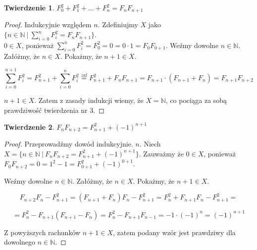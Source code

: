 \documentclass{article}
\newtheorem{thm}{Twierdzenie}
\begin{document}
\begin{thm}
$F_0^2 + F_1^2 + \ldots + F_n^2 = F_nF_{n+1}$
\end{thm}
\begin{proof}
Indukcyjnie względem $n$. Zdefiniujmy $X$ jako $\lbrace n \in \mathbb{N} \ | \ \sum_{i=0}^n F_i^2 = F_nF_{n+1} \rbrace$.\\
$0 \in X$, ponieważ $\sum_{i=0}^n F_i^2 = F_0^2 = 0 = 0 \cdot 1 = F_0 F_{0+1}$.
Weźmy dowolne $n \in \mathbb{N}$. Załóżmy, że $n \in X$. Pokażmy, że $n+1 \in X$.

$$\sum_{i=0}^{n+1} F_i^2 = F_{n+1}^2 + \sum_{i=0}^n F_i^2 \stackrel{zal}{=} F_{n+1}^2 + F_nF_{n+1} = F_{n+1} \cdot \left( F_{n+1} + F_n \right) = F_{n+1}F_{n+2}$$

$n+1 \in X$. Zatem z zasady indukcji wiemy, że $X = \mathbb{N}$, co pociąga za sobą prawdziwość twierdzenia nr 3.

\end{proof}

\begin{thm}
$F_nF_{n+2} = F_{n+1}^2 + (-1)^{n+1}$
\end{thm}
\begin{proof}

Przeprowadźmy dowód indukcyjnie. $n$. Niech $X = \lbrace n \in \mathbb{N} \ | \ F_nF_{n+2} = F_{n+1}^2 + (-1)^{n+1} \rbrace$. Zauważmy że  $0 \in X$, ponieważ $F_0F_{n+2} = 0 = 1^2 - 1 =  F_{0+1}^2 + (-1)^{0+1}$.


Weźmy dowolne $n \in \mathbb{N}$. Załóżmy, że $n \in X$. Pokażmy, że $n+1 \in X$.

$$F_{n+2}F_n - F_{n+1}^2 = \left( F_{n+1} + F_n \right) F_n - F_{n+1}^2 = F_n^2 + F_{n+1} F_n - F_{n+1}^2 = $$

$$= F_n^2 - F_{n+1} \left( F_{n+1} - F_n \right) = F_n^2 - F_{n+1} F_{n-1} = -1 \cdot (-1)^n = \left( -1 \right)^{n+1}$$ 

Z powyższych rachunków $n+1 \in X$, zatem podany wzór jest prawdziwy dla dowolnego $n \in \mathbb{N}$.

\end{proof}


\end{document}
